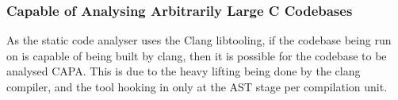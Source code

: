 \subsubsection{Capable of Analysing Arbitrarily Large C Codebases}
As the static code analyser uses the Clang libtooling, if the codebase being run on is capable of being built by clang, then it is possible for the codebase to be analysed CAPA. This is due to the heavy lifting being done by the clang compiler, and the tool hooking in only at the AST stage per compilation unit.


